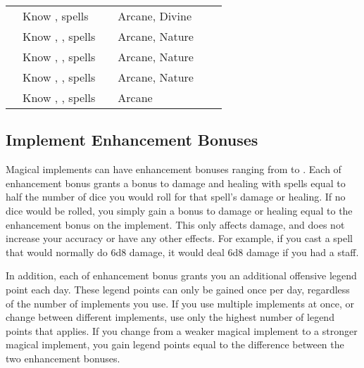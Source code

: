 \begin{longtabuwrapper}
\begin{longtabu}{l X l l l l}
                 & Know ,  spells &  & Arcane, Divine &  \\
                 & Know , ,  spells &  & Arcane, Nature &  \\
                 & Know , ,  spells &  & Arcane, Nature &  \\
                 & Know , ,  spells &  & Arcane, Nature &  \\
                 & Know , ,  spells &  & Arcane &  \\
            \end{longtabu}
        \end{longtabuwrapper}
        \twocolumn

    \subsection{Implement Enhancement Bonuses}\label{Implement Enhancement Bonuses}

        Magical implements can have enhancement bonuses ranging from  to .
        Each  of enhancement bonus grants a bonus to damage and healing with spells equal to half the number of dice you would roll for that spell's damage or healing.
        If no dice would be rolled, you simply gain a bonus to damage or healing equal to the enhancement bonus on the implement.
        This only affects damage, and does not increase your accuracy or have any other effects.
        For example, if you cast a  spell that would normally do 6d8 damage, it would deal 6d8 damage if you had a  staff.

        In addition, each  of enhancement bonus grants you an additional offensive legend point each day.
        These legend points can only be gained once per day, regardless of the number of implements you use.
        If you use multiple implements at once, or change between different implements, use only the highest number of legend points that applies.
        If you change from a weaker magical implement to a stronger magical implement, you gain legend points equal to the difference between the two enhancement bonuses.

